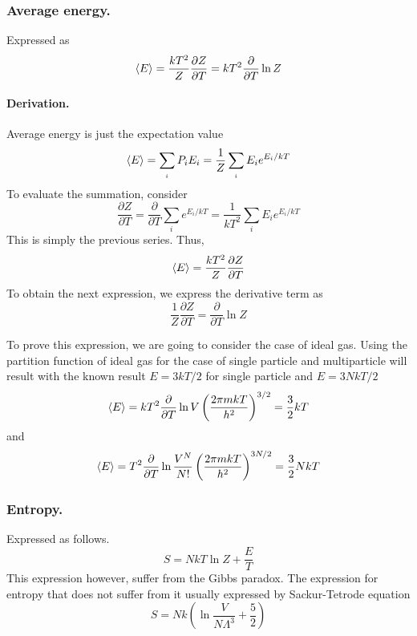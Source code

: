 \documentclass[../../../Main.tex]{subfiles}
\begin{document}
\subsubsection*{Average energy.} Expressed as
\begin{equation*}
    \braket{E}=\frac{kT^2}{Z}\frac{\partial Z}{\partial T}=kT^2\frac{\partial}{\partial T}\ln Z
\end{equation*}

\paragraph*{Derivation.} Average energy is just the expectation value
\begin{equation*}
    \braket{E}=\sum_{_i}P_iE_i=\frac{1}{Z}\sum_{_i}E_ie^{E_i/kT}
\end{equation*}
To evaluate the summation, consider
\begin{equation*}
    \frac{\partial Z}{\partial T}=\frac{\partial}{\partial T}\sum_i e^{E_i/kT}=\frac{1}{kT^2}\sum_i E_ie^{E_i/kT}
\end{equation*}
This is simply the previous series. Thus,
\begin{equation*}
    \braket{E}=\frac{kT^2}{Z}\frac{\partial Z}{\partial T}
\end{equation*}
To obtain the next expression, we express the derivative term as
\begin{equation*}
    \frac{1}{Z}\frac{\partial Z}{\partial T}=\frac{\partial }{\partial T}\ln Z
\end{equation*}

To prove this expression, we are going to consider the case of ideal gas. Using the partition function of ideal gas for the case of single particle and multiparticle will result with the known result $E=3kT/2$ for single particle and $E=3NkT/2$
\begin{equation*}
    \braket{E}=kT^2\frac{\partial}{\partial T}\ln V\left(\frac{2\pi mkT}{h^2}\right)^{3/2}=\frac{3}{2}kT
\end{equation*}
and 
\begin{equation*}
    \braket{E}=T^2\frac{\partial}{\partial T}\ln \frac{V^N}{N!}\left(\frac{2\pi mkT}{h^2}\right)^{3N/2}=\frac{3}{2}NkT
\end{equation*}

\subsubsection*{Entropy.} Expressed as follows.
\begin{equation*}
    S=NkT\ln Z+\frac{E}{T}
\end{equation*}
This expression however, suffer from the Gibbs paradox. The expression for entropy that does not suffer from it usually expressed by Sackur-Tetrode equation
\begin{equation*}
    S=Nk\left(\ln\frac{V}{N\Lambda^3}+\frac{5}{2}\right)
\end{equation*}
\end{document}
